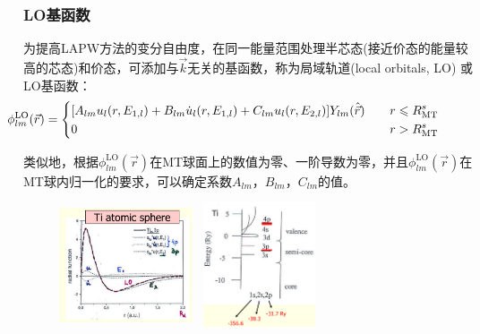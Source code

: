 {
\frametitle{\textrm{LO}基函数}
为提高\textrm{LAPW}方法的变分自由度，在同一能量范围处理半芯态(接近价态的能量较高的芯态)和价态，可添加与$\vec k$无关的基函数，称为局域轨道(\textrm{local orbitals, LO})%
或\textrm{LO}基函数：
{\footnotesize
$$\hskip -40pt \phi_{lm}^{\mathrm{LO}}(\vec r)=\left\{
  \begin{aligned}
    &[A_{lm}u_l(r,E_{1,l})+B_{lm}\dot u_l(r,E_{1,l})+C_{lm}u_l(r,E_{2,l})]Y_{lm}(\hat{\vec r})\quad&r\leqslant R_{\mathrm{MT}}^s\\
    &0 &r>R_{\mathrm{MT}}^s
\end{aligned}
\right.$$}

类似地，根据$\phi_{lm}^{\mathrm{LO}}(\vec r)$在\textrm{MT}球面上的数值为零、一阶导数为零，并且$\phi_{lm}^{\mathrm{LO}}(\vec r)$在\textrm{MT}球内归一化的要求，可以确定系数$A_{lm}$，$B_{lm}$，$C_{lm}$的值。
\begin{figure}[h!]
	\vspace{-15pt}
\centering
\hspace{15pt}
\includegraphics[height=1.45in,width=1.55in,viewport=50 10 470 415,clip]{Figures/WIEN2k-lo.png}
\includegraphics[height=1.45in,width=1.45in,viewport=5 1 570 570,clip]{Figures/semi-core.png}
\caption{\small \textrm{}}%
\label{Muffin_tin_LO}
\end{figure}
}

